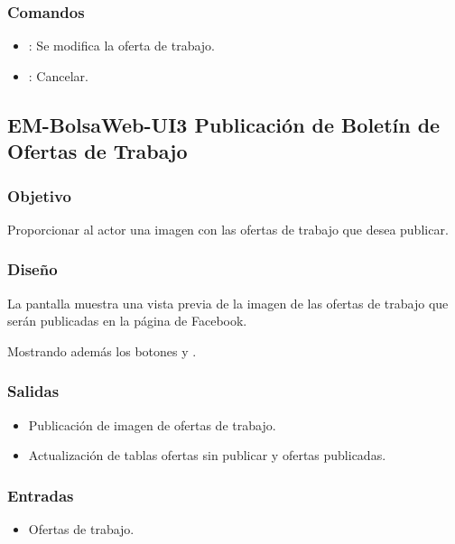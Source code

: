 \subsubsection{Comandos}
\begin{itemize}
	\item {}: Se modifica la oferta de trabajo.  
	\item {}: Cancelar.  
\end{itemize}

\subsection{EM-BolsaWeb-UI3 Publicación de Boletín de Ofertas de Trabajo}

\subsubsection{Objetivo}
	\noindent
	Proporcionar al actor una imagen con las ofertas de trabajo que desea publicar.
\subsubsection{Diseño}
	\noindent
	La pantalla muestra una vista previa de la imagen de las ofertas de trabajo que serán publicadas en la página de Facebook.

	Mostrando además los botones  y .



\subsubsection{Salidas}
	\begin{itemize}
	\item Publicación de imagen de ofertas de trabajo.
	\item Actualización de tablas ofertas sin publicar y ofertas publicadas.
	\end{itemize}
\subsubsection{Entradas}
	\begin{itemize}
	\item Ofertas de trabajo.
	\end{itemize}
